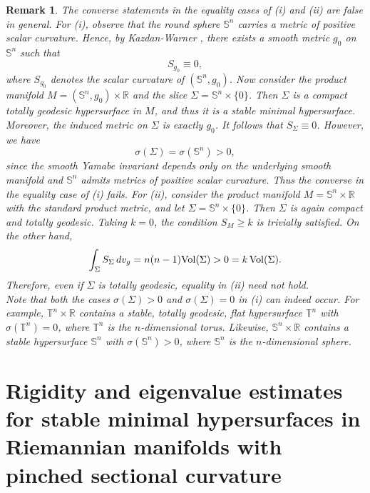 \documentclass[amssymb,amstex,amsmath,11pt]{article}
\numberwithin{equation}{section}
\theoremstyle{plain}
\newtheorem{rmk}[thm]{Remark}
\theoremstyle{definition}
\theoremstyle{remark}
\newcommand{\Vol}{{\rm Vol}}
\begin{document}
\begin{rmk}
{\rm
The converse statements in the equality cases of {\rm (i)} and {\rm (ii)} are false in general. For {\rm (i)}, observe that the round sphere $\mathbb{S}^n$ carries a metric of positive scalar curvature. Hence, by Kazdan-Warner \cite[Theorem 1.3]{KW}, there exists a smooth metric $g_0$ on $\mathbb{S}^n$ such that
$$
S_{g_0}\equiv 0,
$$
where $S_{g_0}$ denotes the scalar curvature of $(\mathbb{S}^n,g_0)$. Now consider the product manifold $M=(\mathbb{S}^n,g_0)\times \mathbb{R}$ and the slice $\Sigma=\mathbb{S}^n\times\{0\}$. Then $\Sigma$ is a compact totally geodesic hypersurface in $M$, and thus it is a stable minimal hypersurface. Moreover, the induced metric on $\Sigma$ is exactly $g_0$. It follows that $S_\Sigma\equiv 0$. However, we have
$$
\sigma(\Sigma)=\sigma(\mathbb{S}^n)>0,
$$
since the smooth Yamabe invariant depends only on the underlying smooth manifold and $\mathbb{S}^n$ admits metrics of positive scalar curvature. Thus the converse in the equality case of {\rm (i)} fails. For {\rm (ii)}, consider the product manifold $M=\mathbb{S}^n\times\mathbb{R}$ with the standard product metric, and let $\Sigma=\mathbb{S}^n\times\{0\}$. Then $\Sigma$ is again compact and totally geodesic. Taking $k=0$, the condition $S_M\ge k$ is trivially satisfied. On the other hand,
$$
\int_\Sigma S_\Sigma\,dv_g
=
n(n-1)\Vol(\Sigma)
>
0
=
k\,\Vol(\Sigma).
$$
Therefore, even if $\Sigma$ is totally geodesic, equality in {\rm (ii)} need not hold. \\

Note that both the cases $\sigma(\Sigma)>0$ and $\sigma(\Sigma)=0$ in {\rm (i)} can indeed occur. For example, $\mathbb{T}^n\times \mathbb{R}$ contains a stable, totally geodesic, flat hypersurface $\mathbb{T}^n$ with $\sigma(\mathbb{T}^n)=0$, where $\mathbb{T}^n$ is the $n$-dimensional torus. Likewise, $\mathbb{S}^n\times \mathbb{R}$ contains a stable hypersurface $\mathbb{S}^n$ with $\sigma(\mathbb{S}^n)>0$, where $\mathbb{S}^n$ is the $n$-dimensional sphere.
}
\end{rmk}




\section{Rigidity and eigenvalue estimates for stable minimal hypersurfaces in Riemannian manifolds with pinched sectional curvature} \label{sec4}
\end{document}
